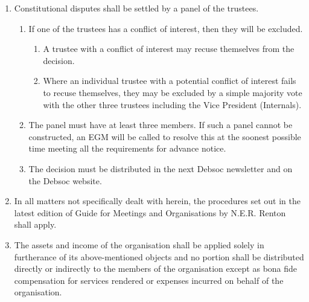 \begin{enumerate}
    \item Constitutional disputes shall be settled by a panel of the trustees.
    \begin{enumerate}
        \item If one of the trustees has a conflict of interest, then they will be excluded.
        \begin{enumerate}
            \item A trustee with a conflict of interest may recuse themselves from the decision.
            \item Where an individual trustee with a potential conflict of interest fails to recuse themselves, they may be excluded by a simple majority vote with the other three trustees including the Vice President (Internals).
        \end{enumerate}
        \item The panel must have at least three members. If such a panel cannot be constructed, an EGM will be called to resolve this at the soonest possible time meeting all the requirements for advance notice.
        \item The decision must be distributed in the next Debsoc newsletter and on the Debsoc website.
    \end{enumerate}
    \item In all matters not specifically dealt with herein, the procedures set out in the latest edition of Guide for Meetings and Organisations by N.E.R. Renton shall apply.
    \item The assets and income of the organisation shall be applied solely in furtherance of its above-mentioned objects and no portion shall be distributed directly or indirectly to the members of the organisation except as bona fide compensation for services rendered or expenses incurred on behalf of the organisation.
\end{enumerate}